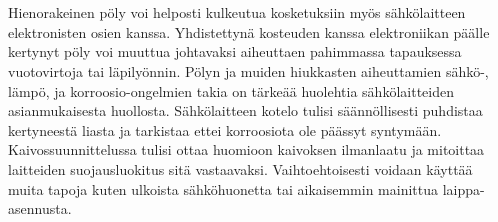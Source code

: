 \documentclass[finnish,12pt,a4paper,pdftex,elec,utf8]{aaltothesis}
\begin{document}
\\\\
Hienorakeinen pöly voi helposti kulkeutua kosketuksiin myös sähkölaitteen elektronisten osien kanssa. Yhdistettynä kosteuden kanssa elektroniikan päälle kertynyt pöly voi muuttua johtavaksi aiheuttaen pahimmassa tapauksessa vuotovirtoja tai läpilyönnin. \cite{Pallasmaa} Pölyn ja muiden hiukkasten aiheuttamien sähkö-, lämpö, ja korroosio-ongelmien takia on tärkeää huolehtia sähkölaitteiden asianmukaisesta huollosta. Sähkölaitteen kotelo tulisi säännöllisesti puhdistaa kertyneestä liasta ja tarkistaa ettei korroosiota ole päässyt syntymään. Kaivossuunnittelussa tulisi ottaa huomioon kaivoksen ilmanlaatu ja mitoittaa laitteiden suojausluokitus sitä vastaavaksi. Vaihtoehtoisesti voidaan käyttää muita tapoja kuten ulkoista sähköhuonetta tai aikaisemmin mainittua laippa-asennusta.

\end{document}
